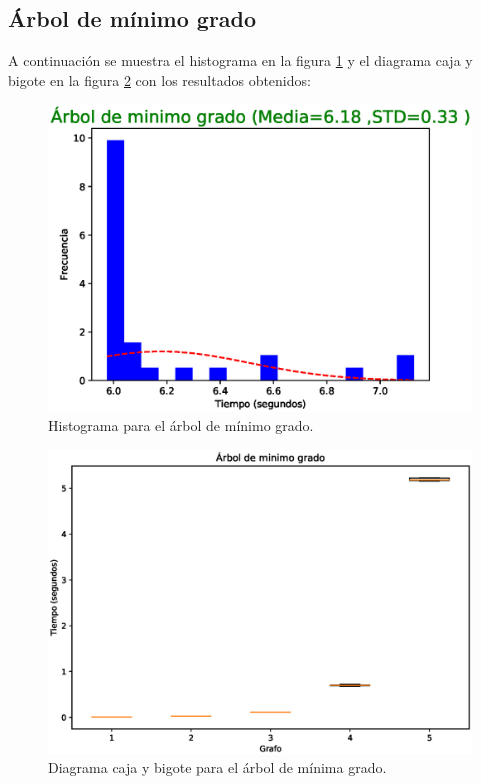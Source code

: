 \documentclass{article}
\begin{document}
\subsection{Árbol de mínimo grado}
A continuación se muestra el histograma en la figura \ref{fig:H4} y el diagrama caja y bigote en la figura \ref{fig:BP4} con los resultados obtenidos:
\begin{figure}[H]
    \includegraphics[width=\textwidth]{H4}
    \caption{Histograma para el árbol de mínimo grado.}
    \label{fig:H4}
\end{figure}
\begin{figure}[H]
    \includegraphics[width=\textwidth]{BP4}
    \caption{Diagrama caja y bigote para el árbol de mínima grado.}
    \label{fig:BP4}
\end{figure}
\end{document}
